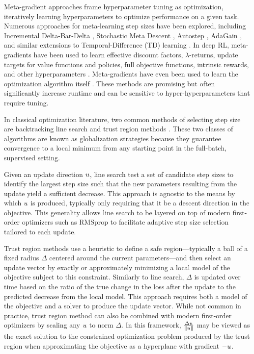Meta-gradient approaches frame
hyperparameter tuning as optimization, iteratively learning hyperparameters to optimize performance on a given task. Numerous approaches for meta-learning step sizes have been explored, including Incremental Delta-Bar-Delta \cite{sutton1992adapting}, Stochastic Meta Descent \cite{schraudolph1999local}, Autostep \cite{mahmood2012tuning}, AdaGain \cite{jacobsen2019metadescent}, and similar extensions to Temporal-Difference
(TD) learning \cite{kearney2018tidbd,young2019metatrace,thill2015temporal}.
In deep RL, meta-gradients have been used to learn effective discount factors, $\lambda$-returns, update targets for value
functions and policies, full objective functions, intrinsic rewards, and other hyperparameters
\cite{xu2018meta,xu2020meta,oh2020discovering,kirsch2020improving,wang2020metasac,zheng2020what,bonnet2022debiasing,zahavy2020self,zheng2018learning}.
Meta-gradients have even been used to learn the optimization algorithm itself
\cite{andrychowicz2016learning,lan2024learning}.
These methods are promising but often significantly increase runtime and can be sensitive to hyper-hyperparameters that require tuning.

In classical optimization literature, two common methods of selecting step size are backtracking line search and trust region methods \cite{nocedal2006numerical}. These two classes of algorithms are known as globalization strategies because they guarantee convergence to a local minimum from any starting point in the full-batch, supervised setting.

Given an update direction $u$, line search test a set of candidate step sizes to identify the largest step size such that the new parameters resulting from the update yield a sufficient decrease. %
This approach is agnostic to the means by which $u$ is produced, typically only requiring that it be a descent direction in the objective. This generality allows line search to be layered on top of modern first-order optimizers such as RMSprop \cite{Hinton2012lecture} to facilitate adaptive step size selection tailored to each update. 

Trust region methods use a heuristic to define a safe region—typically a ball of a fixed radius $\Delta$ centered around the current parameters—and then select an update vector by exactly or approximately minimizing a local model of the objective subject to this constraint. Similarly to line search, $\Delta$ is updated over time based on the ratio of the true change in the loss after the update to the predicted decrease from the local model. This approach requires both a model of the objective and a solver to produce the update vector. While not common in practice, trust region method can also be combined with modern first-order optimizers by scaling any $u$ to norm $\Delta$. In this framework, $\frac{\Delta u}{\left \lVert u \right \rVert}$ may be viewed as the exact solution to the constrained optimization problem produced by the trust region when approximating the objective as a hyperplane with gradient $-u$.

